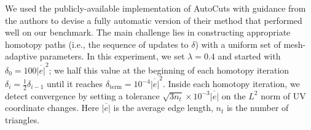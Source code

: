 %
We used the publicly-available implementation of AutoCuts with guidance from the authors to devise a fully automatic version of their method that performed well on our benchmark.  The main challenge lies in constructing appropriate homotopy paths (i.e., the sequence of updates to $\delta$) with a uniform set of mesh-adaptive parameters. In this experiment, we set $\lambda = 0.4$ and started with $\delta_0=100\overline{|e|}^2$; we half this value at the beginning of each homotopy iteration $\delta_i = \frac{1}{2}\delta_{i-1}$ until it reaches $\delta_\text{term}=10^{-4}\overline{|e|}^2$. Inside each homotopy iteration, we detect convergence by setting a tolerance $\sqrt{3n_t}\times10^{-3}\overline{|e|}$ on the $L^2$ norm of UV coordinate changes. Here $\overline{|e|}$ is the average edge length, $n_t$ is the number of triangles.
%

%

